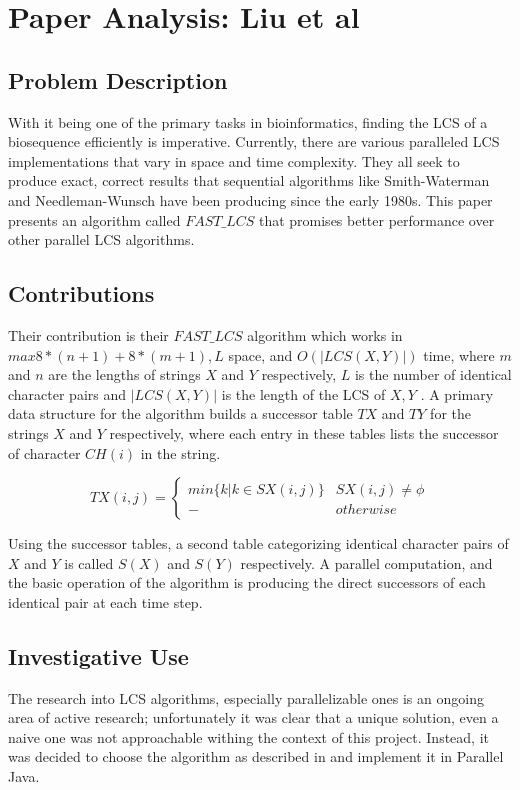 \section{Paper Analysis: Liu et al }

\subsection{Problem Description}
With it being one of the primary tasks in bioinformatics, finding the LCS of a biosequence efficiently is imperative. Currently, there are various paralleled LCS implementations that vary in space and time complexity. They all seek to produce exact, correct results that sequential algorithms like Smith-Waterman and Needleman-Wunsch have been producing since the early 1980s. This paper presents an algorithm called $FAST\_LCS$ that promises better performance over other parallel LCS algorithms.


\subsection{Contributions}
Their contribution is their $FAST\_LCS$ algorithm which works in \\ $max{8*(n+1)+8*(m+1),L}$ space, and $O(|LCS(X,Y)|)$ time, where  $m$ and $n$ are the lengths of strings $X$ and $Y$ respectively, $L$ is the number of identical character pairs and $|LCS(X,Y)|$ is the length of the LCS of $X,Y$ \cite{Liu:2007p402}. A primary data structure for the algorithm builds a successor table $TX$ and $TY$ for the strings $X$ and $Y$ respectively, where each entry in these tables lists the successor of character $CH(i)$ in the string.

\begin{displaymath}
	TX(i,j)=\left\{
	\begin{array}{cl}
		min\{k|k \in SX(i,j)\} & SX(i,j) \neq \phi \\ 
		- 					 & otherwise
	\end{array}
	\right.
\end{displaymath}

\cite{Liu:2007p402}

Using the successor tables, a second table categorizing identical character pairs of $X$ and $Y$ is called $S(X)$ and $S(Y)$ respectively. A parallel computation, and the basic operation of the algorithm is producing the direct successors of each identical pair at each time step.


\subsection{Investigative Use}
The research into LCS algorithms, especially parallelizable ones is an ongoing area of active research; unfortunately it was clear that a unique solution, even a naive one was not approachable withing the context of this project. Instead, it was decided to choose the algorithm as described in \cite{Liu:2007p402} and implement it in Parallel Java.



